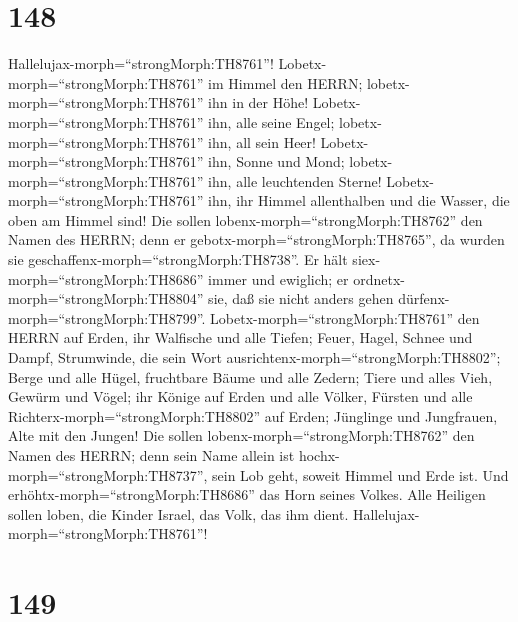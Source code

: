 \hypertarget{section-147}{%
\section{148}\label{section-147}}

 Hallelujax-morph=``strongMorph:TH8761''!
Lobetx-morph=``strongMorph:TH8761'' im Himmel den HERRN;
lobetx-morph=``strongMorph:TH8761'' ihn in der Höhe! 
Lobetx-morph=``strongMorph:TH8761'' ihn, alle seine Engel;
lobetx-morph=``strongMorph:TH8761'' ihn, all sein Heer! 
Lobetx-morph=``strongMorph:TH8761'' ihn, Sonne und Mond;
lobetx-morph=``strongMorph:TH8761'' ihn, alle leuchtenden Sterne!
 Lobetx-morph=``strongMorph:TH8761'' ihn, ihr Himmel
allenthalben und die Wasser, die oben am Himmel sind!  Die
sollen lobenx-morph=``strongMorph:TH8762'' den Namen des HERRN; denn er
gebotx-morph=``strongMorph:TH8765'', da wurden sie
geschaffenx-morph=``strongMorph:TH8738''.  Er hält
siex-morph=``strongMorph:TH8686'' immer und ewiglich; er
ordnetx-morph=``strongMorph:TH8804'' sie, daß sie nicht anders gehen
dürfenx-morph=``strongMorph:TH8799''. 
Lobetx-morph=``strongMorph:TH8761'' den HERRN auf Erden, ihr Walfische
und alle Tiefen;  Feuer, Hagel, Schnee und Dampf,
Strumwinde, die sein Wort ausrichtenx-morph=``strongMorph:TH8802'';
 Berge und alle Hügel, fruchtbare Bäume und alle Zedern;
 Tiere und alles Vieh, Gewürm und Vögel;  ihr
Könige auf Erden und alle Völker, Fürsten und alle
Richterx-morph=``strongMorph:TH8802'' auf Erden;  Jünglinge
und Jungfrauen, Alte mit den Jungen!  Die sollen
lobenx-morph=``strongMorph:TH8762'' den Namen des HERRN; denn sein Name
allein ist hochx-morph=``strongMorph:TH8737'', sein Lob geht, soweit
Himmel und Erde ist.  Und
erhöhtx-morph=``strongMorph:TH8686'' das Horn seines Volkes. Alle
Heiligen sollen loben, die Kinder Israel, das Volk, das ihm dient.
Hallelujax-morph=``strongMorph:TH8761''!

\hypertarget{section-148}{%
\section{149}\label{section-148}}

